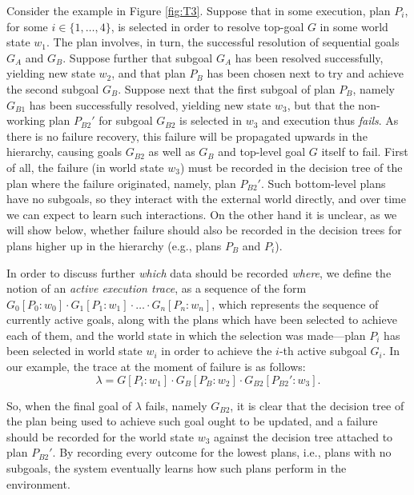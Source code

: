 Consider the example in Figure \ref{fig:T3}.
Suppose that in some execution, plan $P_i$, for some $i \in \{1,\ldots,4\}$, is
selected in order to resolve top-goal $G$ in some world state $w_1$. The plan
involves, in turn, the successful resolution of sequential goals $G_A$ and $G_B$.
Suppose further that subgoal $G_A$ has been resolved successfully, yielding new
state $w_2$, and that plan $P_B$ has been chosen next to try and achieve the
second subgoal $G_B$.
Suppose next that the first subgoal of plan $P_B$, namely $G_{B1}$ has been
successfully resolved, yielding new state $w_3$, but that the non-working plan
$P_{B2}'$ for subgoal $G_{B2}$ is selected in $w_3$ and execution thus
\emph{fails}.
As there is no failure recovery, this failure will be propagated upwards in the
hierarchy, causing goals $G_{B2}$ as well as $G_B$ and top-level goal $G$ itself
to fail.
First of all, the failure (in world state $w_3$) must be recorded in the decision
tree of the plan where the failure originated, namely, plan $P_{B2}'$. 
Such bottom-level plans have no subgoals, so they interact with the
external world directly, and over time we can expect to learn such interactions.
On the other hand it is unclear, as we will show below, whether failure should also be
recorded in the decision trees for plans higher up in the hierarchy (e.g., plans
$P_B$ and $P_i$).






In order to discuss further \emph{which} data should be recorded \emph{where}, we
define the notion of an \textit{active execution trace}, as a sequence of the
form $G_0[P_0:w_0] \cdot G_1[P_1:w_1] \cdot \ldots \cdot G_n[P_n:w_n]$, which
represents the sequence of currently active goals, along with the plans which
have been selected to achieve each of them, and the world state in which the
selection was made---plan $P_i$ has been selected in world state $w_i$ in order
to achieve the $i$-th active subgoal $G_i$.
In our example, the trace at the moment of failure is as follows: \[
\lambda=G[P_i:w_1] \cdot G_B[P_B:w_2] \cdot G_{B2}[P_{B2}':w_3]. \]


So, when the final goal of $\lambda$ fails, namely $G_{B2}$, it is clear that the
decision tree of the plan being used to achieve such goal ought to be updated,
and a failure should be recorded for the world state $w_3$ against 
the decision tree attached to plan $P_{B2}'$.  
By recording every outcome for the lowest plans, i.e., plans with no subgoals,
the system eventually learns how such plans perform in the environment.

